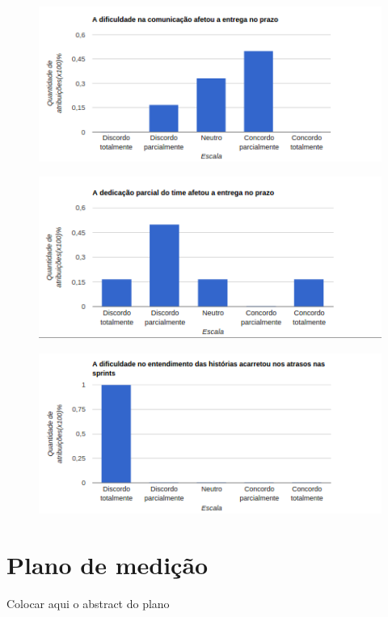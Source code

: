 \begin{apendicesenv}
  			\begin{figure}[!htb]
  			\center
  			\includegraphics[scale=0.9]{figuras/grafico_6.png}
  			\end{figure}
 
  			\begin{figure}[!htb]
  			\center
  			\includegraphics[scale=0.9]{figuras/grafico_7.png}
  			\end{figure}
 
  			\begin{figure}[!htb]
  			\center
  			\includegraphics[scale=0.9]{figuras/grafico_8.png}
  			\end{figure}

  \chapter{Plano de medição}

     Colocar aqui o abstract do plano

    

\end{apendicesenv}
